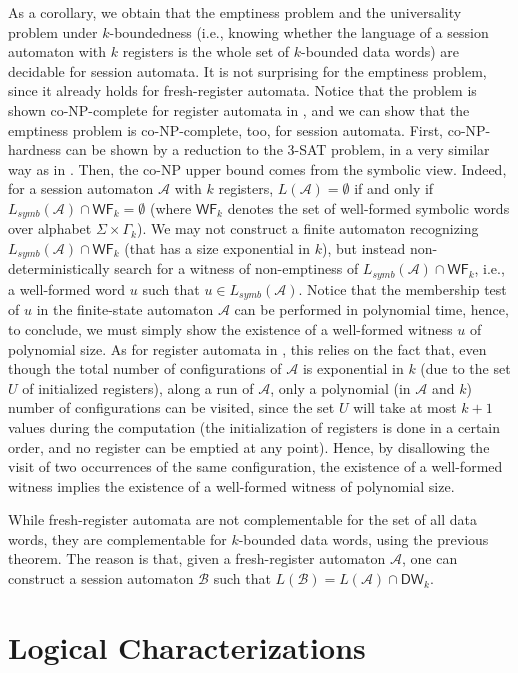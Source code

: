 \documentclass{LMCS}
\def\A{\mathcal A}
\def\B{\mathcal B}
\newcommand{\symbL}{L_\mathit{symb}}
\newcommand{\WF}{\mathsf{WF}}
\newcommand{\Bounded}[1]{\mathsf{DW}_{#1}}
\begin{document}
As a corollary, we obtain that the emptiness problem and the
universality problem under $k$-boundedness (i.e., knowing whether the
language of a session automaton with $k$ registers is the whole set of
$k$-bounded data words) are decidable for session automata. It is not
surprising for the emptiness problem, since it already holds for
fresh-register automata. Notice that the problem is shown
co-NP-complete for register automata in \cite{SakIke00},
and we can show that the
emptiness problem is co-NP-complete, too, for session automata. First,
co-NP-hardness can be shown by a reduction to the 3-SAT problem, in a
very similar way as in \cite{SakIke00}. Then, the co-NP upper bound
comes from the symbolic view. Indeed, for a session automaton $\A$
with $k$ registers, $L(\A)=\emptyset$ if and only if $\symbL(\A) \cap
\WF_k=\emptyset$ (where $\WF_k$ denotes the set of well-formed
symbolic words over alphabet $\Sigma\times \Gamma_k$). We may not
construct a finite automaton recognizing $\symbL(\A) \cap \WF_k$ (that
has a size exponential in $k$), but instead non-deterministically
search for a witness of non-emptiness of $\symbL(\A) \cap \WF_k$,
i.e., a well-formed word $u$ such that $u\in\symbL(\A)$. Notice that
the membership test of $u$ in the finite-state automaton $\A$ can be
performed in polynomial time, hence, to conclude, we must simply show
the existence of a well-formed witness $u$ of polynomial size. As for
register automata in \cite{SakIke00}, this relies on the fact that,
even though the total number of configurations of $\A$ is exponential
in $k$ (due to the set $U$ of initialized registers), along a run of
$\A$, only a polynomial (in $\A$ and $k$) number of configurations can
be visited, since the set $U$ will take at most $k+1$ values during
the computation (the initialization of registers is done in a certain
order, and no register can be emptied at any point). Hence, by
disallowing the visit of two occurrences of the same configuration,
the existence of a well-formed witness implies the existence of a
well-formed witness of polynomial size.

While fresh-register automata are not complementable for the set of
all data words, they are complementable for $k$-bounded data words,
using the previous theorem. The reason is that, given a fresh-register
automaton $\A$, one can construct a session automaton $\B$ such that
$L(\B) = L(\A) \cap \Bounded{k}$.

\section{Logical Characterizations}
\end{document}
